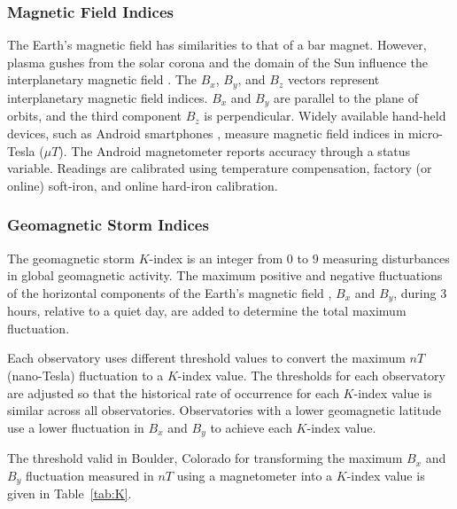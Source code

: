 \documentclass[sn-mathphys-num]{sn-jnl}%
\begin{document}
\subsubsection{Magnetic Field Indices}

The Earth's magnetic field has similarities to that of a bar magnet. However, plasma gushes from the solar corona and the domain of the Sun influence the interplanetary magnetic field \cite{schwenn2001solar, melnikov1990relationships}. The $B_{x}$, $B_{y}$, and $B_{z}$ vectors represent interplanetary magnetic field indices. $B_{x}$ and $B_{y}$ are parallel to the plane of orbits, and the third component $B_{z}$ is perpendicular. Widely available hand-held devices, such as Android smartphones \cite{Android2024SensorTypes}, measure magnetic field indices in micro-Tesla ($\mu T$). The Android magnetometer reports accuracy through a status variable. Readings are calibrated using temperature compensation, factory (or online) soft-iron, and online hard-iron calibration.
 
\subsubsection{Geomagnetic Storm Indices}

The geomagnetic storm $K$-index is an integer from $0$ to $9$ measuring disturbances in global geomagnetic activity. The maximum positive and negative fluctuations of the horizontal components of the Earth's magnetic field \cite{de2007ionosphere}, $B_{x}$ and $B_{y}$, during $3$ hours, relative to a quiet day, are added to determine the total maximum fluctuation.

Each observatory uses different threshold values to convert the maximum $nT$ (nano-Tesla) fluctuation to a $K$-index value. The thresholds for each observatory are adjusted so that the historical rate of occurrence for each $K$-index value is similar across all observatories. Observatories with a lower geomagnetic latitude use a lower fluctuation in $B_{x}$ and $B_{y}$ to achieve each $K$-index value. 

The threshold valid in Boulder, Colorado \cite{NOAA2024bKindex} for transforming the maximum $B_{x}$ and $B_{y}$ fluctuation measured in $nT$ using a magnetometer into a $K$-index value is given in Table~\ref{tab:K}.
\end{document}
